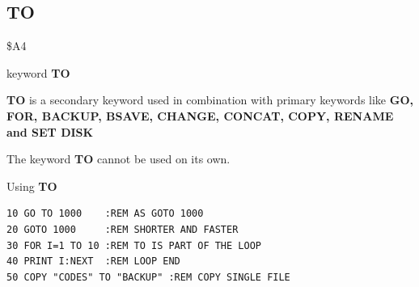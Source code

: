 \newpage
\subsection{TO}
\begin{description}[leftmargin=2cm,style=nextline]
\item [Token:] \$A4
\item [Format:] keyword {\bf TO}
\item [Usage:]  {\bf TO} is a secondary keyword used in
                combination with primary keywords like
                {\bf GO, FOR, BACKUP, BSAVE, CHANGE, CONCAT, COPY,
                RENAME and SET DISK}

\item [Remarks:] The keyword {\bf TO} cannot be used on its own.

\item [Example:] Using {\bf TO}

\begin{tcolorbox}[colback=black,coltext=white]
\verbatimfont{\codefont}
\begin{verbatim}
10 GO TO 1000    :REM AS GOTO 1000
20 GOTO 1000     :REM SHORTER AND FASTER
30 FOR I=1 TO 10 :REM TO IS PART OF THE LOOP
40 PRINT I:NEXT  :REM LOOP END
50 COPY "CODES" TO "BACKUP" :REM COPY SINGLE FILE
\end{verbatim}
\end{tcolorbox}
\end{description}


\newpage

